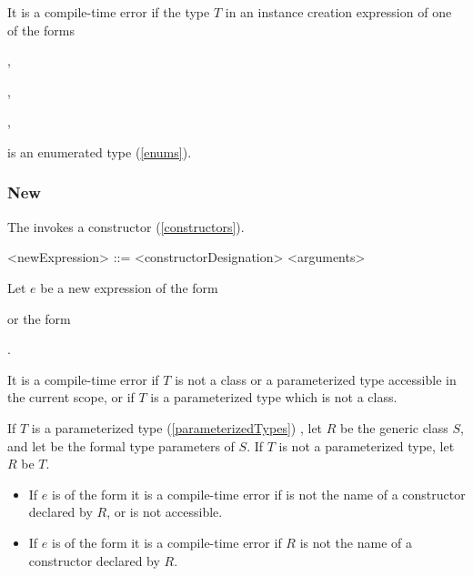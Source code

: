 \documentclass[makeidx]{article}
\begin{document}
{\LMHash{}%
It is a compile-time error if
the type $T$ in an instance creation expression of one of the forms

\noindent
{},

\noindent
{},

\noindent
{},

\noindent
{}

\noindent
is an enumerated type (\ref{enums}).


\subsubsection{New}

\LMHash{}%
The  invokes a constructor (\ref{constructors}).

\begin{grammar}
<newExpression> ::= \NEW{} <constructorDesignation> <arguments>
\end{grammar}

\LMHash{}%
Let $e$ be a new expression of the form

\noindent
{}
or the form

\noindent
{}.

\LMHash{}%
It is a compile-time error if $T$ is not
a class or a parameterized type accessible in the current scope,
or if $T$ is a parameterized type which is not a class.

\LMHash{}%
If $T$ is a parameterized type (\ref{parameterizedTypes})
,
let $R$ be the generic class $S$,
and let
be the formal type parameters of $S$.
If $T$ is not a parameterized type, let $R$ be $T$.

\begin{itemize}
\item
  If $e$ is of the form
  it is a compile-time error if  is not the name of
  a constructor declared by $R$, or \id{} is not accessible.
\item
  If $e$ is of the form
  it is a compile-time error if $R$ is not the name of
  a constructor declared by $R$.
\end{itemize}

}
\end{document}
